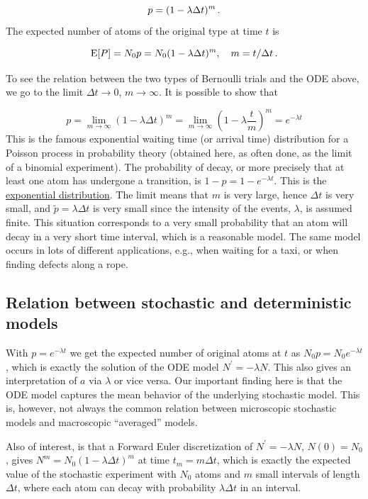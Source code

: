 \documentclass[%
oneside,                 %
final,                   %
10pt]{article}
\begin{document}
\[ p = (1-\lambda\Delta t)^m\tp\]
The expected number of atoms of the original type at time $t$ is

\begin{equation}
\E{P} = N_0p = N_0(1-\lambda\Delta t)^m,\quad m=t/\Delta t\tp
\end{equation}

To see the relation between the two types of Bernoulli trials and the
ODE above, we go to the limit $\Delta t\rightarrow 0$, $m\rightarrow\infty$.
It is possible to show that

\[ p = \lim_{m\rightarrow\infty} (1-\lambda\Delta t)^m
= \lim_{m\rightarrow\infty} \left(1-\lambda\frac{t}{m}\right)^m = e^{-\lambda t}
\]
This is the famous exponential waiting time (or arrival time) distribution for a
Poisson process in probability theory (obtained here, as often done, as
the limit of a binomial experiment). The probability of decay, or more
precisely that at least one atom has undergone a transition, is
$1-p= 1-e^{-\lambda t}$. This is the
\href{{http://en.wikipedia.org/wiki/Exponential_distribution}}{exponential distribution}.
The limit means that $m$ is very
large, hence $\Delta t$ is very small, and $\tilde p=\lambda\Delta t$
is very small since the intensity of the events, $\lambda$, is assumed
finite. This situation corresponds to a very small probability
that an atom will decay in a very short time interval, which is a
reasonable model.
The same model occurs in lots of different applications, e.g.,
when waiting for a taxi, or when finding defects along a rope.

\subsection{Relation between stochastic and deterministic models}

With $p=e^{-\lambda t}$ we get the expected number of original atoms
at $t$ as $N_0p=N_0e^{-\lambda t}$, which is exactly the solution of
the ODE model $N^{\prime}=-\lambda N$. This also gives an interpretation
of $a$ via $\lambda$ or vice versa. Our important finding here
is that the ODE model
captures the mean behavior of the underlying stochastic model. This
is, however, not always the common relation between microscopic stochastic
models and macroscopic ``averaged'' models.

Also of interest, is that a Forward Euler discretization of
$N^{\prime}=-\lambda N$, $N(0)=N_0$, gives $N^m = N_0(1-\lambda\Delta t)^m$
at time $t_m=m\Delta t$, which is exactly the
expected value of the stochastic experiment with $N_0$ atoms
and $m$ small intervals of length $\Delta t$, where each atom can
decay with probability $\lambda\Delta t$ in an interval.
\end{document}
